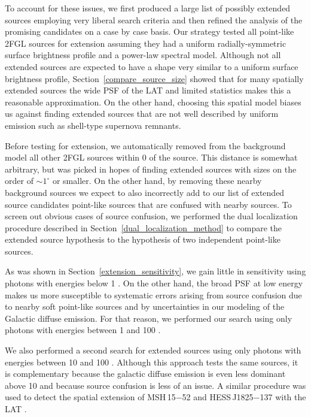 \documentclass[12pt,preprint]{aastex}
\newcommand{\gev}{\text{GeV}\xspace}
\newcommand{\degree}{^\circ\xspace}
\begin{document}
To account for these issues, we first produced a large list of possibly
extended sources employing very liberal search criteria and then
refined the analysis of the promising candidates on a case by case basis.
Our strategy tested all point-like 2FGL sources for extension assuming
they had a uniform radially-symmetric surface brightness profile
and a power-law spectral model.  Although not all extended sources are
expected to have a shape very similar to a uniform surface brightness
profile, Section~\ref{compare_source_size} showed that for many spatially
extended sources the wide PSF of the LAT and limited statistics makes
this a reasonable approximation.  On the other hand, choosing this
spatial model biases us against finding extended sources that are not
well described by uniform emission such as shell-type supernova remnants.

Before testing for extension, we automatically removed from the background
model all other 2FGL sources within 0 of the source.  This distance
is somewhat arbitrary, but was picked in hopes of finding extended
sources with sizes on the order of $\sim1\degree$ or smaller. On the
other hand, by removing these nearby background sources we expect to
also incorrectly add to our list of extended source candidates
point-like sources that
are confused with nearby sources.  To screen out obvious cases of source
confusion, we performed the dual localization procedure described in
Section~\ref{dual_localization_method} to compare the extended source
hypothesis to the hypothesis of two independent point-like sources.

As was shown in Section~\ref{extension_sensitivity}, we gain little in
sensitivity using photons with energies below 1 \gev. On the other hand,
the broad PSF at low energy makes us more susceptible to systematic
errors arising from source confusion due to nearby soft point-like sources
and by uncertainties in our modeling of the Galactic diffuse emission. 
For that reason,
we performed our search using only photons with energies between 1 \gev
and 100 \gev.

We also performed a second search for extended sources using only
photons with energies between 10 \gev and 100 \gev.  Although this
approach tests the same sources, it is complementary because the galactic
diffuse emission is even less dominant above 10 \gev and because source
confusion is less of an issue.  A similar procedure was used to detect
the spatial extension of MSH\,15$-$52 and
HESS\,J1825$-$137 with the LAT \citep{msh1552,fermi_hess_j1825}.
\end{document}
